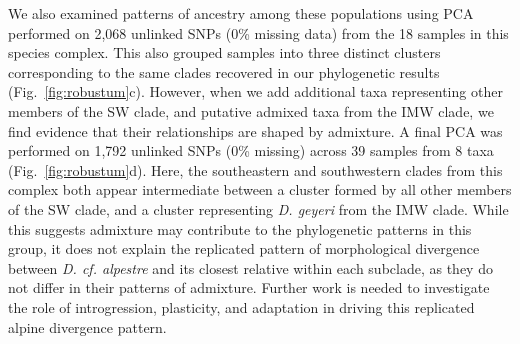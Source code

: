 \documentclass[11pt]{article}
\begin{document}
%  

% 
We also examined patterns of ancestry among these populations using PCA performed
on 2,068 unlinked SNPs (0\% missing data) from the 18 samples in this species complex.
This also grouped samples into three distinct clusters corresponding to the same clades recovered in our phylogenetic results (Fig.~\ref{fig:robustum}c).
% 
However, when we add additional taxa representing other members of the SW clade, and
putative admixed taxa from the IMW clade, we find evidence that their relationships are shaped by admixture.
% 
A final PCA was performed on 1,792 unlinked SNPs (0\% missing) across 39 samples 
from 8 taxa (Fig.~\ref{fig:robustum}d). 
Here, the southeastern and southwestern clades from this complex both appear intermediate between a cluster formed by all other members of the SW clade, and a cluster representing \emph{D. geyeri} from the IMW clade.
% 
% 
While this suggests admixture may contribute to the phylogenetic patterns in this group, it does not explain the replicated pattern of morphological divergence 
between \emph{D. cf. alpestre} and its closest relative within each subclade, as they do not differ in their patterns of admixture.
Further work is needed to investigate the role of introgression, plasticity, and adaptation in driving this replicated alpine divergence pattern.
\end{document}
